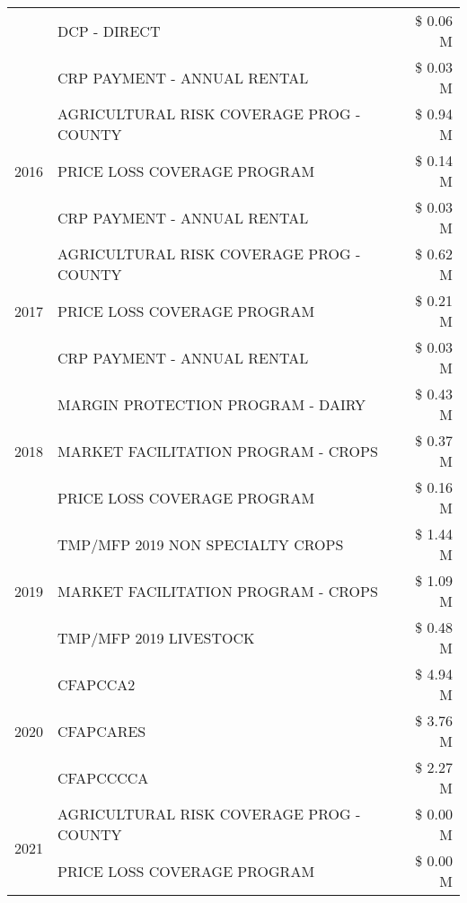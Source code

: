 \begin{tabular}{llr}
 & DCP - DIRECT & \$ 0.06 M \\
 & CRP PAYMENT - ANNUAL RENTAL & \$ 0.03 M \\
\cline{1-3}
\multirow[t]{3}{*}{2016} & AGRICULTURAL RISK COVERAGE PROG - COUNTY & \$ 0.94 M \\
 & PRICE LOSS COVERAGE PROGRAM & \$ 0.14 M \\
 & CRP PAYMENT - ANNUAL RENTAL & \$ 0.03 M \\
\cline{1-3}
\multirow[t]{3}{*}{2017} & AGRICULTURAL RISK COVERAGE PROG - COUNTY & \$ 0.62 M \\
 & PRICE LOSS COVERAGE PROGRAM & \$ 0.21 M \\
 & CRP PAYMENT - ANNUAL RENTAL & \$ 0.03 M \\
\cline{1-3}
\multirow[t]{3}{*}{2018} & MARGIN PROTECTION PROGRAM - DAIRY & \$ 0.43 M \\
 & MARKET FACILITATION PROGRAM - CROPS & \$ 0.37 M \\
 & PRICE LOSS COVERAGE PROGRAM & \$ 0.16 M \\
\cline{1-3}
\multirow[t]{3}{*}{2019} & TMP/MFP 2019 NON SPECIALTY CROPS & \$ 1.44 M \\
 & MARKET FACILITATION PROGRAM - CROPS & \$ 1.09 M \\
 & TMP/MFP 2019 LIVESTOCK & \$ 0.48 M \\
\cline{1-3}
\multirow[t]{3}{*}{2020} & CFAPCCA2 & \$ 4.94 M \\
 & CFAPCARES & \$ 3.76 M \\
 & CFAPCCCCA & \$ 2.27 M \\
\cline{1-3}
\multirow[t]{2}{*}{2021} & AGRICULTURAL RISK COVERAGE PROG - COUNTY & \$ 0.00 M \\
 & PRICE LOSS COVERAGE PROGRAM & \$ 0.00 M \\
\cline{1-3}
\bottomrule
\end{tabular}
